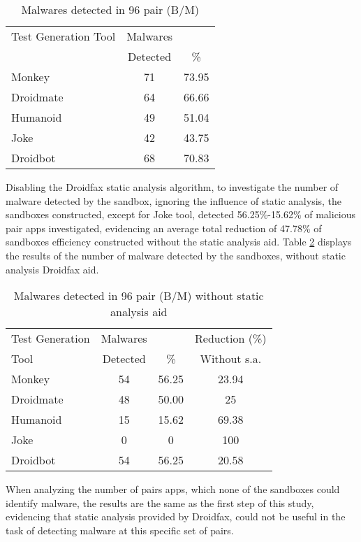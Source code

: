 \begin{table}[ht]
\centering
\begin{tabular}{lcc}\toprule
 Test Generation Tool & Malwares & \\
 & Detected & \% \\ \midrule
 Monkey & 71 & 73.95 \\
 Droidmate & 64 &  66.66  \\
 Humanoid & 49 & 51.04  \\
 Joke & 42 & 43.75  \\
 Droidbot & 68 & 70.83  \\\midrule
 
\end{tabular} 
\caption{Malwares detected in 96 pair (B/M)}
\label{tab:malware}
\end{table}

Disabling the Droidfax static analysis algorithm, to investigate the number of malware detected by the sandbox, ignoring the influence of static analysis, the sandboxes constructed, except for Joke tool, detected 56.25\%-15.62\% of malicious pair apps investigated, evidencing an average total reduction of 47.78\% of sandboxes efficiency constructed without the static analysis aid. Table \ref{tab:malwareWithout} displays the results of the number of malware detected by the sandboxes, without static analysis Droidfax aid. 

\begin{table}[ht]
\centering
\begin{tabular}{lccc}\toprule
 Test Generation & Malwares & & Reduction (\%)\\
 Tool & Detected  & \% & Without s.a.\\ \midrule
 Monkey & 54 & 56.25 & 23.94\\
 Droidmate & 48 &  50.00 & 25 \\
 Humanoid & 15 & 15.62 & 69.38  \\
 Joke & 0 & 0 & 100 \\
 Droidbot & 54 & 56.25 & 20.58  \\\midrule
 
\end{tabular} 
\caption{Malwares detected in 96 pair (B/M) without static analysis aid}
\label{tab:malwareWithout}
\end{table}


When analyzing the number of pairs apps, which none of the sandboxes could identify malware, the results are the same as the first step of this study, evidencing that static analysis provided by Droidfax, could not be useful in the task of detecting malware at this specific set of pairs.

